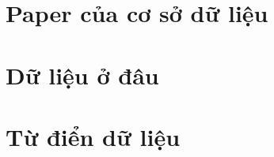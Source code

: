 \documentclass{article}
\begin{document}


\newpage

\section{Paper của cơ sở dữ liệu}


\section{Dữ liệu ở đâu}


\section{Từ điển dữ liệu}

\end{document}
